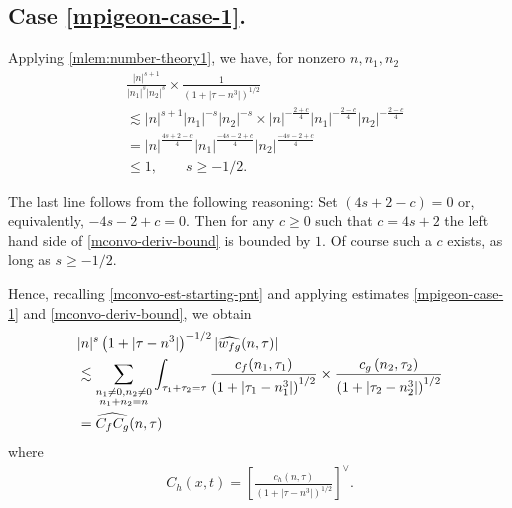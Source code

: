 \subsection{Case \texorpdfstring{\eqref{mpigeon-case-1}}{1}.} 
Applying \cref{mlem:number-theory1}, we have, for nonzero $ n, n_1, n_2 $
%
\begin{equation}
	\label{mconvo-deriv-bound}
	\begin{split}
		& \frac{|n|^{s+1}}{|n_1|^s 
		| n_2|^s}
		\times
		\frac{1}{(1 + | \tau -n^3 |)^{1/2}}
		\\
		& \lesssim | n |^{s+1}| n_1 |^{-s}| n_2 |^{-s} \times | n
		|^{-\frac{2+c}{4}}| n_1 |^{-\frac{2-c}{4}}| n_2 |^{-\frac{2-c}{4}} 
		\\
		& = | n |^{\frac{4s +2 -c}{4}} | n_1 |^{\frac{-4s -2 +c}{4}} | n_2
		|^{\frac{-4s -2 +c}{4}}
		\\
		& \le 1, \qquad s \ge -1/2.
	\end{split}  
\end{equation}
%
%
\begin{framed}
\begin{remark}
	\label{mrem:s-val}
	The last line follows from the following reasoning: Set $(4s + 2 -c) = 0$
or, equivalently, $-4s -2 +c = 0$. Then for any $c \ge 0$ such that $c = 4s+2$
the left hand side of
\eqref{mconvo-deriv-bound} is bounded by $1$. Of course such a $c$ exists, as
long as $s \ge -1/2$.
\end{remark}
\end{framed}
%
%
%
Hence, recalling \eqref{mconvo-est-starting-pnt} and applying estimates 
\eqref{mpigeon-case-1} and \eqref{mconvo-deriv-bound}, we obtain
%
%
\begin{equation}
	\label{mnon-lin-rep-with-bound}
	\begin{split}
		& |n|^s \left( 1 + | \tau - n^3 | \right)^{-1/2} | 
		\widehat{w_{fg}}(n, \tau) | 
		\\
		& \lesssim \sum_{\substack{n_1 \neq0, n_2 \neq 0 \\n_1 + n_2 =n}} \int_{\tau_1 + \tau_2 = \tau}\frac{c_f(n_1, \tau_1)}{\left( 1 + | 
		\tau_1 -  n_1^3| \right)^{1/2}}
		\times \frac{c_g\left( n_2, \tau_2\right)}{\left( 1 + | \tau_2 -n_2^3|
		\right)^{1/2}}
		\\
		& = \widehat{C_f C_g}(n, \tau)
	\end{split}
\end{equation}
%
%
where
\begin{equation*}
	\begin{split}
		C_h(x,t) =
		\left[ \frac{c_h(n, \tau)}{\left( 1 + | \tau - n^3 | 
		\right)^{1/2}}\right]^\vee .	
	\end{split}
\end{equation*}
